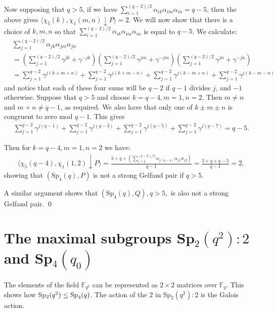 \documentclass{amsart}
\begin{document}
Now supposing that $q>5$, if we have $\sum_{i=1}^{(q-2)/2}\alpha_{ik}\alpha_{im}\alpha_{in}=q-5$, then the above gives $\langle \chi_5(k), \chi_1(m, n)\downarrow P\rangle=2$. We will now show that there is a choice of $k, m, n$ so that $\sum_{i=1}^{(q-2)/2}\alpha_{ik}\alpha_{im}\alpha_{in}$ is equal to  $q-5$.
We calculate:
\begin{align*}
&\sum_{j=1}^{(q-2)/2}\alpha_{jk}\alpha_{jm}\alpha_{jn}\\
&= \left(\sum_{j=1}^{(q-2)/2} \gamma^{jk}+\gamma^{-jk}\right)\left(\sum_{j=1}^{(q-2)/2} \gamma^{jm}+\gamma^{-jm}\right)\left(\sum_{j=1}^{(q-2)/2} \gamma^{jn}+\gamma^{-jn}\right)\\
&=\sum_{j=1}^{q-2} \gamma^{j(k+m+n)} + \sum_{j=1}^{q-2} \gamma^{j(k+m-n)} + \sum_{j=1}^{q-2} \gamma^{j(k-m+n)} + \sum_{j=1}^{q-2} \gamma^{j(k-m-n)}
\end{align*}
and notice that each of these four sums will be $q-2$ if $q-1$ divides  $j$, and $-1$ otherwise. Suppose that $q>5$ and choose $k=q-4, m=1, n=2$. Then  $m\neq n$ and $m+n\neq q-1$, as required. We also have that only one of $k\pm m \pm n $ is congruent to zero mod
  ${q-1}$. This gives
\begin{align*}
&\sum_{j=1}^{q-2} \gamma^{j(q-1)} + \sum_{j=1}^{q-2} \gamma^{j(q-3)} + \sum_{j=1}^{q-2} \gamma^{j(q-5)} + \sum_{j=1}^{q-2} \gamma^{j(q-7)} = q-5.
\end{align*}

Then for $k=q-4, m=1, n=2$ we have:
\begin{align*}
&\langle \chi_5(q-4), \chi_1(1, 2)\downarrow P\rangle = \frac{3+q+\left(\sum_{j=1}^{(q-2)/2} \alpha_{j(q-4)}\alpha_{j1}\alpha_{j2}\right)}{q-1}
 = \frac{3+q+q-5}{q-1}
= 2,
\end{align*}
showing that $(\mathrm{Sp}_4(q), P)$ is not a strong Gelfand pair if $q>5$.

A similar argument shows that $(\mathrm{Sp}_4(q), Q), q>5,$ is also not a strong Gelfand pair.
\qed
\medskip



\section {The maximal subgroups Sp$_2(q^2):2$ and {\rm Sp}$_4(q_0)$}

The elements of  the field $\mathbb F_{q^2}$ can be represented as $2 \times 2$ matrices over $\mathbb F_q$. This shows how Sp$_2(q^2)\le
{\rm Sp}_4(q)$. The action of the $2$ in Sp$_2(q^2):2$ is the Galois action. 
\end{document}
